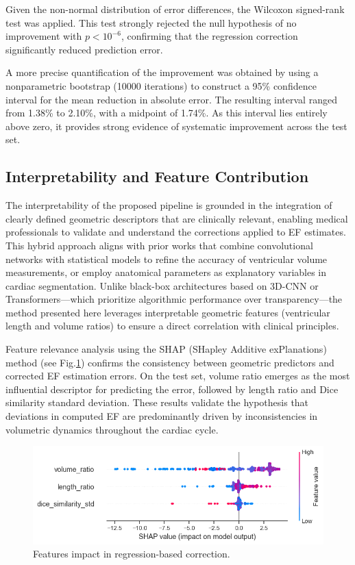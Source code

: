 \documentclass[runningheads]{llncs}
\begin{document}
Given the non-normal distribution of error differences, the Wilcoxon signed-rank test was applied. This test strongly rejected the null hypothesis of no improvement with $p < 10^{-6}$, confirming that the regression correction significantly reduced prediction error.

A more precise quantification of the improvement was obtained by using a nonparametric bootstrap (10000 iterations) to construct a 95\% confidence interval for the mean reduction in absolute error. The resulting interval ranged from 1.38\% to 2.10\%, with a midpoint of 1.74\%. As this interval lies entirely above zero, it provides strong evidence of systematic improvement across the test set.

\subsection{Interpretability and Feature Contribution}

The interpretability of the proposed pipeline is grounded in the integration of clearly defined geometric descriptors that are clinically relevant, enabling medical professionals to validate and understand the corrections applied to EF estimates. This hybrid approach aligns with prior works that combine convolutional networks with statistical models to refine the accuracy of ventricular volume measurements\cite{zhang2024automated}, or employ anatomical parameters as explanatory variables in cardiac segmentation\cite{wu2021automated}. Unlike black-box architectures based on 3D-CNN or Transformers—which prioritize algorithmic performance over transparency—the method presented here leverages interpretable geometric features (ventricular length and volume ratios) to ensure a direct correlation with clinical principles.

Feature relevance analysis using the SHAP (SHapley Additive exPlanations) method\cite{lundberg2017} (see Fig.\ref{fig:shap}) confirms the consistency between geometric predictors and corrected EF estimation errors. On the test set, volume ratio emerges as the most influential descriptor for predicting the error, followed by length ratio and Dice similarity standard deviation. These results validate the hypothesis that deviations in computed EF are predominantly driven by inconsistencies in volumetric dynamics throughout the cardiac cycle.

\begin{figure}
    \centering
    \includegraphics[width=0.7\linewidth]{shap_values.png}
    \caption{Features impact in regression-based correction.}
    \label{fig:shap}
\end{figure}
\end{document}
